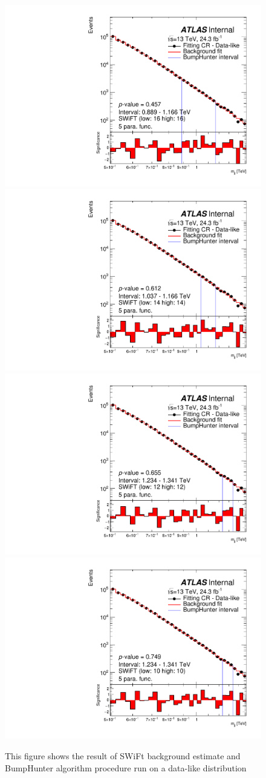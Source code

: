 \begin{figure}[!htb]
{}
 {
  \includegraphics[width=0.45\linewidth, angle=0]{figs/Dibjet/LowMass/FitStudy/bhFit_corrFitCR_dataLike_v13_5para_low16_high16.pdf}
}
 {
  \includegraphics[width=0.45\linewidth, angle=0]{figs/Dibjet/LowMass/FitStudy/bhFit_corrFitCR_dataLike_v13_5para_low14_high14.pdf}
}
 {
  \includegraphics[width=0.45\linewidth, angle=0]{figs/Dibjet/LowMass/FitStudy/bhFit_corrFitCR_dataLike_v13_5para_low12_high12.pdf}
}
 {
  \includegraphics[width=0.45\linewidth, angle=0]{figs/Dibjet/LowMass/FitStudy/bhFit_corrFitCR_dataLike_v13_5para_low10_high10.pdf}
}
\vspace{10pt}
\caption{\label{fig:app-bhFit_lm_corrFitCR_dataLike}
  This figure shows the result of SWiFt background estimate and {\sc BumpHunter} algorithm procedure run on a data-like distribution
}
\end{figure}
